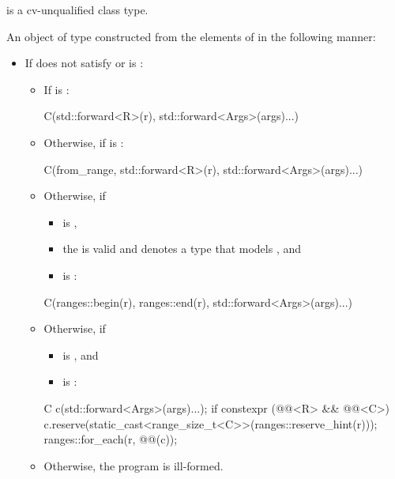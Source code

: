 \begin{itemdescr}
\pnum
\mandates
{} is a cv-unqualified class type.

\pnum
\returns
An object of type 
constructed from the elements of  in the following manner:
\begin{itemize}
\item
If  does not satisfy  or
is :
\begin{itemize}
\item
If  is :
\begin{codeblock}
C(std::forward<R>(r), std::forward<Args>(args)...)
\end{codeblock}
\item
Otherwise, if
is :
\begin{codeblock}
C(from_range, std::forward<R>(r), std::forward<Args>(args)...)
\end{codeblock}
\item
Otherwise, if
\begin{itemize}
\item
{} is ,
\item
the 
is valid and denotes a type that models
, and
\item
{}
is :
\end{itemize}
\begin{codeblock}
C(ranges::begin(r), ranges::end(r), std::forward<Args>(args)...)
\end{codeblock}
\item
Otherwise, if
\begin{itemize}
\item
{} is , and
\item
{} is :
\end{itemize}
\begin{codeblock}
C c(std::forward<Args>(args)...);
if constexpr (@@<R> && @@<C>)
  c.reserve(static_cast<range_size_t<C>>(ranges::reserve_hint(r)));
ranges::for_each(r, @@(c));
\end{codeblock}
\item
Otherwise, the program is ill-formed.
\end{itemize}


\end{itemize}
\end{itemdescr}
